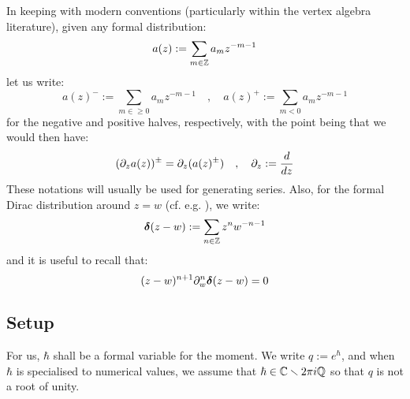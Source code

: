             \begin{convention}
                In keeping with modern conventions (particularly within the vertex algebra literature), given any formal distribution:
                    $$a(z) := \sum_{m \in \mathbb{Z}} a_m z^{-m - 1}$$
                let us write:
                    $$a(z)^- := \sum_{m \in \geq 0} a_m z^{-m - 1} \quad, \quad a(z)^+ := \sum_{m < 0} a_m z^{-m - 1}$$
                for the negative and positive halves, respectively, with the point being that we would then have:
                    $$(\partial_z a(z))^{\pm} = \partial_z( a(z)^{\pm} ) \quad, \quad \partial_z := \frac{d}{dz}$$
                These notations will usually be used for generating series. Also, for the formal Dirac distribution around $z = w$ (cf. e.g. \cite[Subsection 1.1.3]{frenkel_ben_zvi_vertex_algebras_and_algebraic_curves}), we write:
                    $$\boldsymbol{\delta}(z - w) := \sum_{n \in \mathbb{Z}} z^n w^{-n - 1}$$
                and it is useful to recall that:
                    $$(z - w)^{n + 1} \partial_w^n \boldsymbol{\delta}(z - w) = 0$$
            \end{convention}

        \subsection{Setup}
            For us, $\hbar$ shall be a formal variable for the moment. We write $q := e^{\hbar}$, and when $\hbar$ is specialised to numerical values, we assume that $\hbar \in \mathbb{C} \smallsetminus 2\pi i \mathbb{Q}$ so that $q$ is not a root of unity.
        
